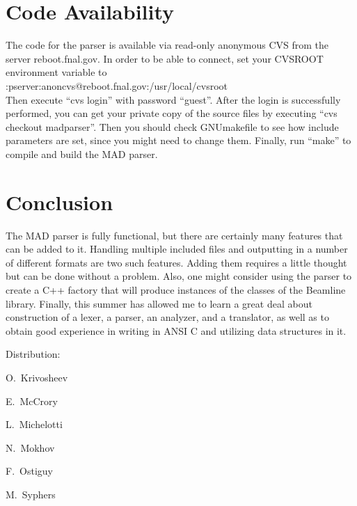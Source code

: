 \documentclass[12pt]{article}
\begin{document}
\section{Code Availability}
The code for the parser is available via read-only anonymous CVS from
the server reboot.fnal.gov. In order to be able to connect, set your
CVSROOT environment variable to \\

:pserver:anoncvs@reboot.fnal.gov:/usr/local/cvsroot \\

\noindent Then execute ``cvs login'' with password ``guest''. After the
login is successfully performed, you can get your private copy of the source
files by executing ``cvs checkout madparser''. Then you should check
GNUmakefile to see how include parameters are set, since you might need to
change them. Finally, run ``make'' to compile and build the MAD parser.

\section{Conclusion}
The MAD parser is fully functional, but there are certainly many features
that can be added to it. Handling multiple included files and outputting
in a number of different formats are two such features. Adding them requires
a little thought but can be done without a problem. Also, one might consider
using the parser to create a C++ factory that will produce instances of the
classes of the Beamline library. Finally, this summer has allowed me to learn
a great deal about construction of a lexer, a parser, an analyzer, and a
translator, as well as to obtain good experience in writing in ANSI C and
utilizing data structures in it.

\vspace{30mm}
\noindent Distribution:

O.~Krivosheev

E.~McCrory

L.~Michelotti

N.~Mokhov

F.~Ostiguy

M.~Syphers
\end{document}
